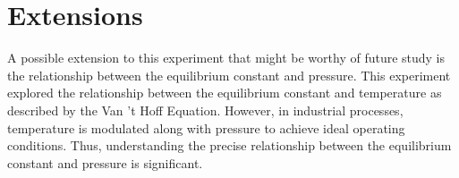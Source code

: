 \section{Extensions}
A possible extension to this experiment that might be worthy of future study is the relationship between the equilibrium constant and pressure. This experiment explored the relationship between the equilibrium constant and temperature as described by the Van 't Hoff Equation. However, in industrial processes, temperature is modulated along with pressure to achieve ideal operating conditions. Thus, understanding the precise relationship between the equilibrium constant and pressure is significant.
